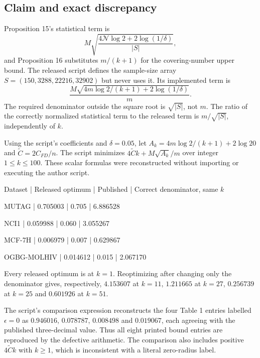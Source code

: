 \documentclass[10pt]{article}
\begin{document}
\subsection*{Claim and exact discrepancy}
Proposition 15’s statistical term is \[M\sqrt{\frac{4\mathcal N\log2+2\log(1/\delta)}{|S|}},\] and Proposition 16 substitutes \(m/(k+1)\) for the covering-number upper bound. The released script defines the sample-size array \(S=(150,3288,22216,32902)\) but never uses it. Its implemented term is \[\frac{M\sqrt{4m\log2/(k+1)+2\log(1/\delta)}}{m}.\] The required denominator outside the square root is \(\sqrt{|S|}\), not \(m\). The ratio of the correctly normalized statistical term to the released term is \(m/\sqrt{|S|}\), independently of \(k\).\par
Using the script’s coefficients and \(\delta=0.05\), let \(A_k=4m\log2/(k+1)+2\log20\) and \(\widetilde C=2C_{FD}/n\). The script minimizes \(4\widetilde Ck+M\sqrt{A_k}/m\) over integer \(1\le k\le100\). These scalar formulas were reconstructed without importing or executing the author script.\par
Dataset | Released optimum | Published | Correct denominator, same \(k\)\par
MUTAG | 0.705003 | 0.705 | 6.886528\par
NCI1 | 0.059988 | 0.060 | 3.055267\par
MCF-7H | 0.006979 | 0.007 | 0.629867\par
OGBG-MOLHIV | 0.014612 | 0.015 | 2.067170\par
Every released optimum is at \(k=1\). Reoptimizing after changing only the denominator gives, respectively, \(4.153607\) at \(k=11\), \(1.211665\) at \(k=27\), \(0.256739\) at \(k=25\) and \(0.601926\) at \(k=51\).\par
The script’s comparison expression reconstructs the four Table 1 entries labelled \(\epsilon=0\) as \(0.946016\), \(0.078787\), \(0.008498\) and \(0.019067\), each agreeing with the published three-decimal value. Thus all eight printed bound entries are reproduced by the defective arithmetic. The comparison also includes positive \(4\widetilde Ck\) with \(k\ge1\), which is inconsistent with a literal zero-radius label.\par
\end{document}
